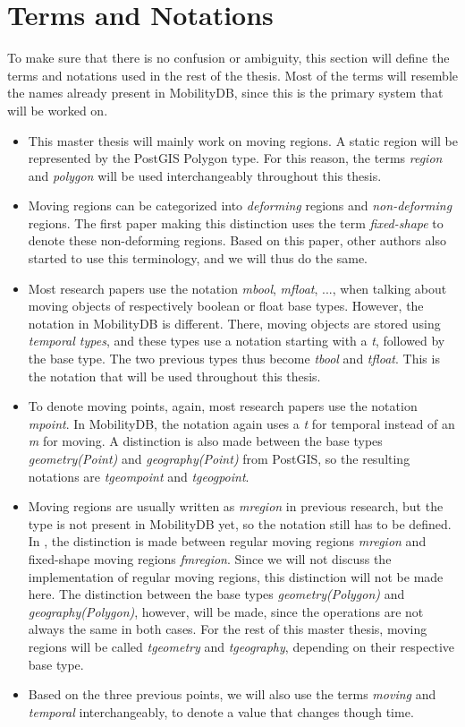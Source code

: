 \section{Terms and Notations}

To make sure that there is no confusion or ambiguity, this section will define the terms and notations used in the rest of the thesis. Most of the terms will resemble the names already present in MobilityDB, since this is the primary system that will be worked on.

\begin{itemize}
    \item This master thesis will mainly work on moving regions. A static region will be represented by the PostGIS Polygon type. For this reason, the terms \textit{region} and \textit{polygon} will be used interchangeably throughout this thesis.

    \item Moving regions can be categorized into \textit{deforming} regions and \textit{non-deforming} regions. The first paper \cite{fmregion} making this distinction uses the term \textit{fixed-shape} to denote these non-deforming regions. Based on this paper, other authors \cite{modeling_and_representing, polyhedra} also started to use this terminology, and we will thus do the same.

    \item Most research papers use the notation \textit{mbool}, \textit{mfloat}, ..., when talking about moving objects of respectively boolean or float base types. However, the notation in MobilityDB is different. There, moving objects are stored using \textit{temporal types}, and these types use a notation starting with a \textit{t}, followed by the base type. The two previous types thus become \textit{tbool} and \textit{tfloat}. This is the notation that will be used throughout this thesis.

    \item To denote moving points, again, most research papers use the notation \textit{mpoint}. In MobilityDB, the notation again uses a \textit{t} for temporal instead of an \textit{m} for moving. A distinction is also made between the base types \textit{geometry(Point)} and \textit{geography(Point)} from PostGIS, so the resulting notations are \textit{tgeompoint} and \textit{tgeogpoint}.

    \item Moving regions are usually written as \textit{mregion} in previous research, but the type is not present in MobilityDB yet, so the notation still has to be defined. In \cite{fmregion}, the distinction is made between regular moving regions \textit{mregion} and fixed-shape moving regions \textit{fmregion}. Since we will not discuss the implementation of regular moving regions, this distinction will not be made here. The distinction between the base types \textit{geometry(Polygon)} and \textit{geography(Polygon)}, however, will be made, since the operations are not always the same in both cases. For the rest of this master thesis, moving regions will be called \textit{tgeometry} and \textit{tgeography}, depending on their respective base type.

    \item Based on the three previous points, we will also use the terms \textit{moving} and \textit{temporal} interchangeably, to denote a value that changes though time.
\end{itemize}